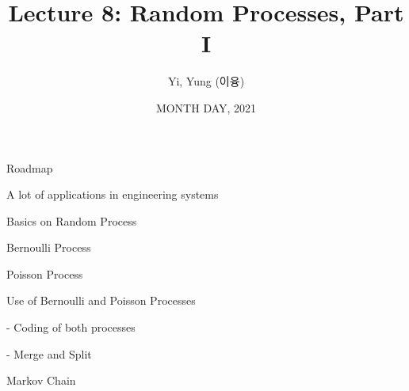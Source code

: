 

\csname\pdfmode\endcsname




\title[]{Lecture 8: Random Processes, Part I}
\author{Yi, Yung (이융)}
\date{MONTH DAY, 2021}








\begin{frame}
  \titlepage
\end{frame}




\begin{frame}{Roadmap}

\plitemsep 0.1in

\bci 
\item A lot of applications in engineering systems


\bigskip

\item Basics on Random Process

\medskip
\item Bernoulli Process
\item Poisson Process
\item Use of Bernoulli and Poisson Processes

- Coding of both processes

- Merge and Split

\medskip
\item Markov Chain

\eci 

\end{frame}

